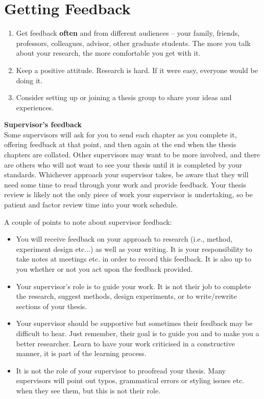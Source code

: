 \appendix

\newpage

\section{Getting Feedback} \label{app:feedback}
\begin{enumerate}
	\item Get feedback \textbf{often} and from different audiences – your family,
	      friends, professors, colleagues, advisor, other graduate students. The more you
	      talk about your research, the more comfortable you get with it.
	\item Keep a positive attitude. Research is hard. If it were easy, everyone would be
	      doing it.
	\item Consider setting up or joining a thesis group to share your ideas and
	      experiences.
\end{enumerate}

\textbf{Supervisor's feedback}\\
Some supervisors will ask for you to send each chapter as you complete it, offering feedback at that point, and then again at the end when the thesis chapters are collated. Other supervisors may want to be more involved, and there are others who will not want to see your thesis until it is completed by your standards. Whichever approach your supervisor takes, be aware that they will need some time to read through your work and provide feedback. Your thesis review is likely not the only piece of work your supervisor is undertaking, so be patient and factor review time into your work schedule.

A couple of points to note about supervisor feedback:
\begin{itemize}
	\item You will receive feedback on your approach to research (i.e., method,
	      experiment design etc...) as well as your writing. It is your responsibility to
	      take notes at meetings etc. in order to record this feedback. It is also up to
	      you whether or not you act upon the feedback provided.
	\item Your supervisor's role is to guide your work. It is not their job to complete
	      the research, suggest methods, design experiments, or to write/rewrite sections
	      of your thesis.
	\item Your supervisor should be supportive but sometimes their feedback may be
	      difficult to hear. Just remember, their goal is to guide you and to make you a
	      better researcher. Learn to have your work criticised in a constructive manner,
	      it is part of the learning process.
	\item It is not the role of your supervisor to proofread your thesis. Many
	      supervisors will point out typos, grammatical errors or styling issues etc.
	      when they see them, but this is not their role.
\end{itemize}
\newpage

